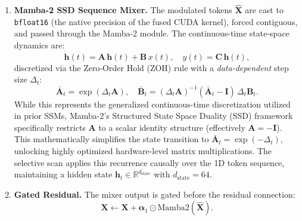\documentclass[12pt,letterpaper]{report}
\begin{document}
\begin{enumerate}
    \item \textbf{Mamba-2 SSD Sequence Mixer.} The modulated tokens
        $\hat{\mathbf{X}}$ are cast to \texttt{bfloat16} (the native precision
        of the fused CUDA kernel), forced contiguous, and passed through the
        Mamba-2 module. The continuous-time state-space dynamics are:
        \begin{equation}\label{eq:ssm-ct}
            \dot{\mathbf{h}}(t) = \mathbf{A}\,\mathbf{h}(t) + \mathbf{B}\,x(t),
            \quad
            y(t) = \mathbf{C}\,\mathbf{h}(t),
        \end{equation}
        discretized via the Zero-Order Hold (ZOH) rule with a
        \emph{data-dependent} step size $\Delta_t$:
\begin{equation}\label{eq:ssm-disc}
            \bar{\mathbf{A}}_t = \exp(\Delta_t \mathbf{A}),
            \quad
            \bar{\mathbf{B}}_t = (\Delta_t \mathbf{A})^{-1}
                (\bar{\mathbf{A}}_t - \mathbf{I})\,\Delta_t \mathbf{B}_t.
        \end{equation}
        While this represents the generalized continuous-time discretization utilized in prior SSMs, Mamba-2's Structured State Space Duality (SSD) framework specifically restricts $\mathbf{A}$ to a scalar identity structure (effectively $\mathbf{A} = -\mathbf{I}$). This mathematically simplifies the state transition to $\bar{\mathbf{A}}_t = \exp(-\Delta_t)$, unlocking highly optimized hardware-level matrix multiplications. The selective scan applies this recurrence causally over the 1D token sequence, maintaining a hidden state $\mathbf{h}_t \in \mathbb{R}^{d_{\mathrm{state}}}$ with $d_{\mathrm{state}} = 64$.

    \item \textbf{Gated Residual.} The mixer output is gated before the
        residual connection:
        \begin{equation}\label{eq:gate1}
            \mathbf{X} \leftarrow \mathbf{X}
            + \boldsymbol{\alpha}_1 \odot \mathrm{Mamba2}(\hat{\mathbf{X}}).
        \end{equation}


\end{enumerate}
\end{document}
